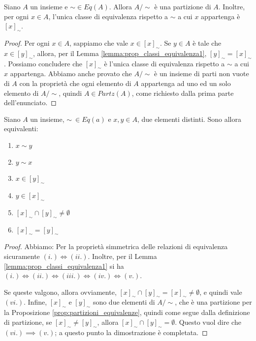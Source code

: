 \begin{propbox}\label{prop:partizioni_equivalenze}
	Siano $A$ un insieme e $\sim \in Eq(A)$. Allora $A/{\sim}$ è una partizione di $A$. Inoltre, per ogni $x \in A$, l'unica classe di equivalenza rispetto a $\sim$ a cui $x$ appartenga è $[x]_{\sim}$.
\end{propbox}
\begin{proof}
	Per ogni $x \in A$, sappiamo che vale $x \in [x]_{\sim}$. Se $y \in A$ è tale che $x \in [y]_{\sim}$, allora, per il Lemma \ref{lemma:prop_classi_equivalenza1}, $[y]_{\sim}=[x]_{\sim}$. Possiamo concludere che $[x]_{\sim}$ è l'unica classe di equivalenza rispetto a $\sim$ a cui $x$ appartenga. Abbiamo anche provato che $A/{\sim}$ è un insieme di parti non vuote di $A$ con la proprietà che ogni elemento di $A$ appartenga ad uno ed un solo elemento di $A/{\sim}$, quindi $A \in Partz(A)$, come richiesto dalla prima parte dell'enunciato.
\end{proof}

\begin{lemmabox}\label{lemma:prop_classi_equivalenza2}
	Siano $A$ un insieme, $\sim  \ \in Eq(a)$ e $x,y \in A$, due elementi distinti. Sono allora equivalenti:
	\begin{enumerate}[label=(\textit{\roman*})]
		\item $x \sim y$
		\item $y \sim x$
		\item $x \in [y]_{\sim}$
		\item $y \in [x]_{\sim}$
		\item $[x]_{\sim} \cap [y]_{\sim} \neq \emptyset$
		\item $[x]_{\sim} = [y]_{\sim}$
		
	\end{enumerate}
\end{lemmabox}

\begin{proof} Abbiamo:
Per la proprietà simmetrica delle relazioni di equivalenza sicuramente $(i.) \iff (ii.)$. Inoltre, per il Lemma \ref{lemma:prop_classi_equivalenza1} si ha $(i.) \iff (ii.) \iff (iii.) \iff (iv.) \iff (v.)$.

Se queste valgono, allora ovviamente, $[x]_{\sim} \cap [y]_{\sim}=[x]_{\sim} \neq \emptyset$, e quindi vale $(vi.)$. Infine, $[x]_{\sim}$ e $[y]_{\sim}$ sono due elementi di $A/{\sim}$, che è una partizione per la Proposizione \ref{prop:partizioni_equivalenze}, quindi come segue dalla definizione di partizione, se $[x]_{\sim} \neq [y]_{\sim}$, allora $[x]_{\sim} \cap [y]_{\sim} = \emptyset$. Questo vuol dire che $(vi.) \implies (v.)$; a questo punto la dimostrazione è completata.
\end{proof}



